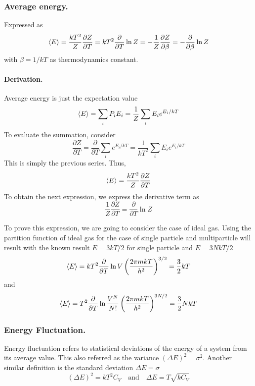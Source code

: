 \documentclass[../../../Main.tex]{subfiles}
\begin{document}
\subsubsection*{Average energy.} Expressed as
\begin{equation*}
	\braket{E}=\frac{kT^2}{Z}\frac{\partial Z}{\partial T}=kT^2\frac{\partial}{\partial T}\ln Z=-\frac{1}{Z}\frac{\partial Z}{\partial \beta}=-\frac{\partial}{\partial \beta}\ln Z
\end{equation*}
with $\beta=1/kT$ as thermodynamics constant.

\paragraph*{Derivation.} Average energy is just the expectation value
\begin{equation*}
	\braket{E}=\sum_{_i}P_iE_i=\frac{1}{Z}\sum_{_i}E_ie^{E_i/kT}
\end{equation*}
To evaluate the summation, consider
\begin{equation*}
	\frac{\partial Z}{\partial T}=\frac{\partial}{\partial T}\sum_i e^{E_i/kT}=\frac{1}{kT^2}\sum_i E_ie^{E_i/kT}
\end{equation*}
This is simply the previous series. Thus,
\begin{equation*}
	\braket{E}=\frac{kT^2}{Z}\frac{\partial Z}{\partial T}
\end{equation*}
To obtain the next expression, we express the derivative term as
\begin{equation*}
	\frac{1}{Z}\frac{\partial Z}{\partial T}=\frac{\partial }{\partial T}\ln Z
\end{equation*}

To prove this expression, we are going to consider the case of ideal gas. Using the partition function of ideal gas for the case of single particle and multiparticle will result with the known result $E=3kT/2$ for single particle and $E=3NkT/2$
\begin{equation*}
	\braket{E}=kT^2\frac{\partial}{\partial T}\ln V\left(\frac{2\pi mkT}{h^2}\right)^{3/2}=\frac{3}{2}kT
\end{equation*}
and
\begin{equation*}
	\braket{E}=T^2\frac{\partial}{\partial T}\ln \frac{V^N}{N!}\left(\frac{2\pi mkT}{h^2}\right)^{3N/2}=\frac{3}{2}NkT
\end{equation*}

\subsubsection*{Energy Fluctuation.}
Energy fluctuation refers to statistical deviations of the energy of a system from its average value.
This also referred as the variance $(\Delta E)^2=\sigma^2$.
Another similar definition is the standard deviation $\Delta E=\sigma$
\begin{equation*}
	(\Delta E)^2=kT^2C_V\quad\text{and}\quad \Delta E=T\sqrt{kC_V}
\end{equation*}
\end{document}
